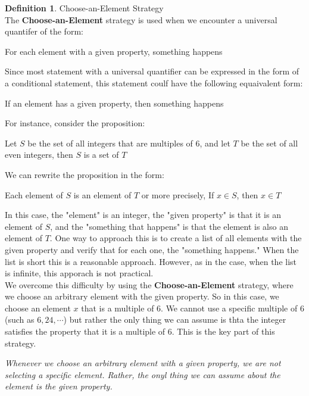 \documentclass{book}
\theoremstyle{definition}
\newtheorem{definition}{Definition}[section]
\theoremstyle{remark}
\begin{document}
\begin{definition}
Choose-an-Element Strategy \\

    The \textbf{Choose-an-Element} strategy is used when we encounter a universal quantifer of the form: 
        \begin{center}
            For each element with a given property, something happens
        \end{center}
    Since most statement with a universal quantifier can be expressed in the form of a conditional statement, this statement coulf have the following equaivalent form: 
        \begin{center}
            If an element has a given property, then something happens
        \end{center}
    For instance, consider the proposition:
        \begin{center}
            Let $S$ be the set of all integers that are multiples of $6$, and let $T$ be the set of all even integers, then $S$ is a set of $T$
        \end{center}
    We can rewrite the proposition in the form:
        \begin{center}
            Each element of $S$ is an element of $T$ or more precisely, If $x \in S$, then $x \in T$
        \end{center}
    
    In this case, the "element" is an integer, the "given property" is that it is an element of $S$, and the "something that happens" is that the element is also an element of $T$. One way to approach this is to create a list of all elements with the given property and verify that for each one, the "something happens." When the list is short this is a reasonable approach. However, as in the case, when the list is infinite, this apporach is not practical. \\
    
    We overcome this difficulty by using the \textbf{Choose-an-Element} strategy, where we choose an arbitrary element with the given property. So in this case, we choose an element $x$ that is a multiple of $6$. We cannot use a specific multiple of $6$ (such as $6, 24, \cdots$) but rather the only thing we can assume is thta the integer satisfies the property that it is a multiple of $6$. This is the key part of this strategy.
        \begin{center}
            \textit{Whenever we choose an arbitrary element with a given property, we are not selecting a specific element. Rather, the onyl thing we can assume about the element is the given property.}
        \end{center}
    

\end{definition}
\end{document}
